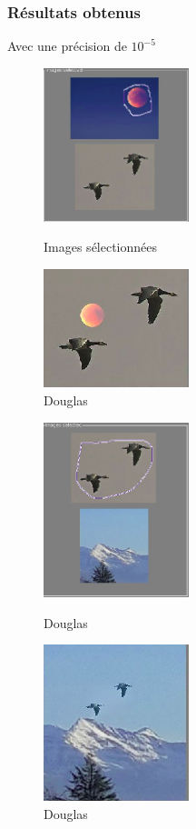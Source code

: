 \subsubsection{Résultats obtenus}
Avec une précision de $10^{-5}$

\begin{figure}[!htb]
   \begin{minipage}{0.5\textwidth}
     \centering
     \includegraphics[width = 120pt]{Images/Resultats/Douglas1b.png}
     \caption{Images sélectionnées}
      \end{minipage}\hfill
   \begin{minipage}{0.5\textwidth}
     \centering
     \includegraphics[width = 120pt]{Images/Resultats/Douglas1.png}
     \caption{Douglas}
      \end{minipage}\hfill
\end{figure}
\begin{figure}[!htb]
   \begin{minipage}{0.5\textwidth}
     \centering
     \includegraphics[width = 120pt]{Images/Resultats/Douglas2b.png}
     \caption{Douglas}
      \end{minipage}\hfill
   \begin{minipage}{0.5\textwidth}
     \centering
     \includegraphics[width = 120pt]{Images/Resultats/Douglas2.png}
     \caption{Douglas}
      \end{minipage}\hfill
\end{figure}

